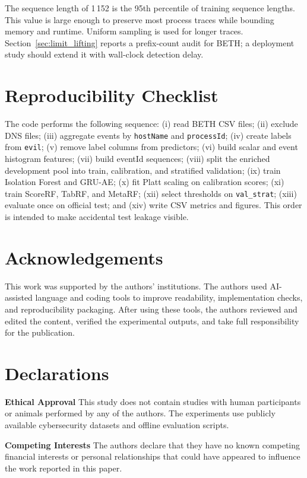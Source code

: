 \documentclass[10pt,journal,compsoc]{IEEEtran}
\begin{document}
The sequence length of 1\,152 is the 95th percentile of training sequence lengths. This value is large enough to preserve most process traces while bounding memory and runtime. Uniform sampling is used for longer traces. Section~\ref{sec:limit_lifting} reports a prefix-count audit for BETH; a deployment study should extend it with wall-clock detection delay.

\section{Reproducibility Checklist}
\label{app:checklist}

The code performs the following sequence: (i) read BETH CSV files; (ii) exclude DNS files; (iii) aggregate events by \texttt{hostName} and \texttt{processId}; (iv) create labels from \texttt{evil}; (v) remove label columns from predictors; (vi) build scalar and event histogram features; (vii) build eventId sequences; (viii) split the enriched development pool into train, calibration, and stratified validation; (ix) train Isolation Forest and GRU-AE; (x) fit Platt scaling on calibration scores; (xi) train ScoreRF, TabRF, and MetaRF; (xii) select thresholds on \texttt{val\_strat}; (xiii) evaluate once on official test; and (xiv) write CSV metrics and figures. This order is intended to make accidental test leakage visible.

\section*{Acknowledgements}
This work was supported by the authors' institutions. The authors used AI-assisted language and coding tools to improve readability, implementation checks, and reproducibility packaging. After using these tools, the authors reviewed and edited the content, verified the experimental outputs, and take full responsibility for the publication.

\section*{Declarations}
\begin{sloppypar}
\noindent\textbf{Ethical Approval} This study does not contain studies with human participants or animals performed by any of the authors. The experiments use publicly available cybersecurity datasets and offline evaluation scripts.
\end{sloppypar}

\noindent
\begin{sloppypar}
\textbf{Competing Interests} The authors declare that they have no known competing financial interests or personal relationships that could have appeared to influence the work reported in this paper.
\end{sloppypar}
\end{document}

